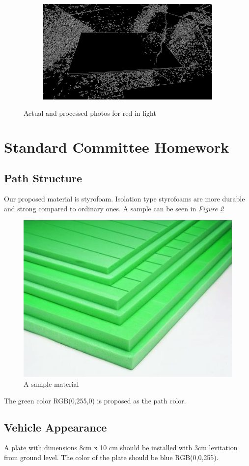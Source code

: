 \documentclass[a4paper,12pt]{article}
\begin{document}
\begin{appendices}
\begin{figure}[H]
\begin{subfigure}{.5\textwidth}
	\end{subfigure}%
	\begin{subfigure}{.5\textwidth}
		\centering
		\includegraphics[width=.9\textwidth]{red-light-canny-processed-1.jpg}
	\end{subfigure}
	\caption{\label{redlight} Actual and processed photos for red in light}
\end{figure}
\section{Standard Committee Homework}
\subsection{Path Structure}

Our proposed material is styrofoam. Isolation type styrofoams are more durable and strong compared to ordinary ones. A sample can be seen in \textit{Figure \ref{strofor}}
\begin{figure}[h]
	\includegraphics[width=.4\textwidth,center]{strofor.jpg}
	\caption{A sample material}\label{strofor}
\end{figure}

The green color RGB(0,255,0) is proposed as the path color.

\subsection{Vehicle Appearance}

A plate with dimensions 8cm x 10 cm should be installed with 3cm levitation from ground level. The color of the plate should be blue RGB(0,0,255).


\end{appendices}
\end{document}

